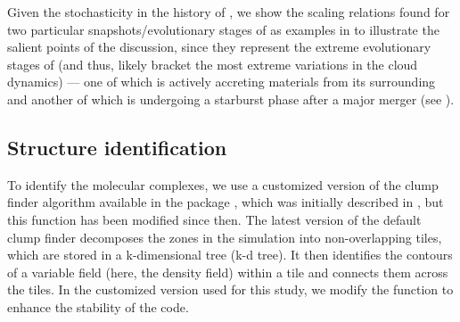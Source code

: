 \documentclass[iop]{emulateapj}
\begin{document}
Given the stochasticity in the \SF history of \flower,
we show the scaling relations found for two particular snapshots/evolutionary stages of \flower
as examples in  to illustrate the salient points of the discussion,
since they represent the extreme evolutionary stages of \flower (and thus, likely bracket the
most extreme variations in the cloud dynamics) --- one of which \flower is
actively accreting materials from its surrounding 
and another of which \flower is undergoing
a starburst phase after a major merger (see ).


\subsection{Structure identification} \label{sec:method}
To identify the molecular complexes, we use a customized version of the clump finder algorithm available in the  package  \citep{Turk2011a}, which was initially described in \citet{Smith09a}, but this function has been modified since then.
%
The latest version of the default  clump finder decomposes the zones in the simulation into non-overlapping tiles, which are stored in a k-dimensional tree (k-d tree). It then identifies the contours of a variable field (here, the density field) within a tile and connects them across the tiles. 
In the customized version used for this study, we modify the function to enhance the stability of the code.
\end{document}
